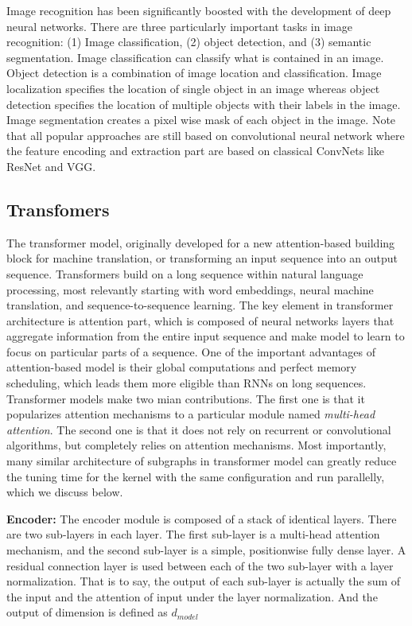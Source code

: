 Image recognition has been significantly boosted with the development of deep neural networks. There are three particularly important 
tasks in image recognition: (1) Image classification, (2) object detection, and (3) semantic segmentation. Image classification can classify what is contained in an image. Object detection is a combination of image location and classification. Image localization specifies the location of single object in an image whereas object detection specifies the location of multiple objects with their labels in the image. Image segmentation creates a pixel wise mask of each object in the image. Note that all popular approaches are still based on convolutional neural network where the feature encoding and extraction part are based on classical ConvNets like ResNet and VGG.

\subsection{Transfomers}

The transformer model, originally developed for a new attention-based building block for machine translation, or transforming an input sequence into an output 
sequence. Transformers build on a long sequence within natural language processing, most relevantly starting with word embeddings, neural machine translation, and 
sequence-to-sequence learning. The key element in transformer architecture is attention part, which is composed of neural networks layers that aggregate 
information from the entire input sequence and make model to learn to focus on particular parts of a sequence. One of the important advantages of attention-based model is their global computations and perfect memory scheduling, which leads them more eligible than 
RNNs on long sequences. Transformer models make two mian contributions. The first one is that it popularizes attention mechanisms to a particular module named 
\textit{multi-head attention}. The second one is that it does not rely on recurrent or convolutional algorithms, but completely relies on attention mechanisms. 
Most importantly, many similar architecture of subgraphs in transformer model can greatly reduce the tuning time for the kernel with the same configuration and run
parallelly, which we discuss below.

\textbf{Encoder:} The encoder module is composed of a stack of identical layers. There are two sub-layers in each layer. The first sub-layer is a multi-head 
attention mechanism, and the second sub-layer is a simple, positionwise fully dense layer. A residual connection layer is used between each of the two sub-layer
with a layer normalization. That is to say, the output of each sub-layer is actually the sum of the input and the attention of input under the layer normalization.
And the output of dimension is defined as $d_{model}$

